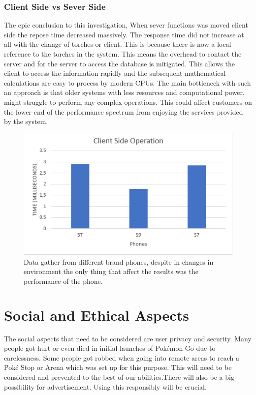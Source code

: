 \documentclass[12pt,a4paper,twoside]{report}
\begin{document}
 
 \subsubsection{Client Side vs Sever Side }
 The epic conclusion to this investigation, When sever functions was moved client side the repose time decreased massively. The response time did not increase at all with the change of torches or client. This is because there is now a local reference to the torches in the system. This means the overhead to contact the server and for the server to access the database is mitigated. This allows the client to access the information rapidly and the subsequent mathematical calculations are easy to process by modern CPUs. The main bottleneck with such an approach is that older systems with less resources and computational power, might struggle to perform any complex operations. This could affect customers on the lower end of the performance spectrum from enjoying the services provided by the system.
 
 
 
 
  
 \begin{figure}
     \centering
     \includegraphics[width=0.5\linewidth]{CLIENTSIDEOP.png}
     \caption{Data gather from different brand phones, despite in changes in environment the only thing that affect the results was the performance of the phone.}
     \label{30torches}
 \end{figure}
 
\newpage
\section{Social and Ethical Aspects}
The social aspects that need to be considered are user privacy and security. Many people got hurt or even died in initial launches of Pokémon Go due to carelessness. Some people got robbed when going into remote areas to reach a Poké Stop or Arena which was set up for this purpose\cite{17}. This will need to be considered and prevented to the best of our abilities.There will also be a big possibility for advertisement. Using this responsibly will be crucial.
\end{document}
